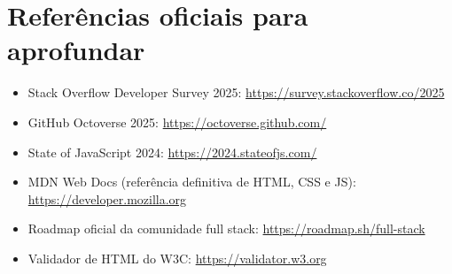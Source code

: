 \section{Referências oficiais para aprofundar}

\begin{itemize}[leftmargin=*, itemsep=0.3em]
  \item Stack Overflow Developer Survey 2025: \url{https://survey.stackoverflow.co/2025}
  \item GitHub Octoverse 2025: \url{https://octoverse.github.com/}
  \item State of JavaScript 2024: \url{https://2024.stateofjs.com/}
  \item MDN Web Docs (referência definitiva de HTML, CSS e JS): \url{https://developer.mozilla.org}
  \item Roadmap oficial da comunidade full stack: \url{https://roadmap.sh/full-stack}
  \item Validador de HTML do W3C: \url{https://validator.w3.org}
\end{itemize}
